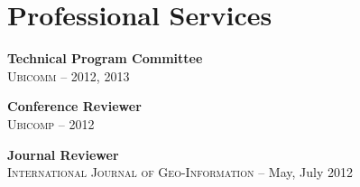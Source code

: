 \section{\sc Professional Services}
{\bf Technical Program Committee}\\
\textsc{Ubicomm} -- 2012, 2013

{\bf Conference Reviewer}\\
\textsc{Ubicomp} -- 2012

{\bf Journal Reviewer}\\
\textsc{International Journal of Geo-Information} -- May, July 2012
